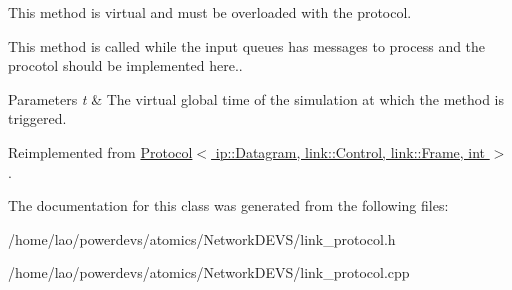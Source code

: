 This method is virtual and must be overloaded with the protocol. 

This method is called while the input queues has messages to process and the procotol should be implemented here..


\begin{DoxyParams}{Parameters}
{\em t} & The virtual global time of the simulation at which the method is triggered. \\
\hline
\end{DoxyParams}


Reimplemented from \hyperlink{classProtocol_a9c6247fa4ea8524d1214fca4cacbd781}{Protocol$<$ ip\+::\+Datagram, link\+::\+Control, link\+::\+Frame, int $>$}.



The documentation for this class was generated from the following files\+:\begin{DoxyCompactItemize}
\item 
/home/lao/powerdevs/atomics/\+Network\+D\+E\+V\+S/link\+\_\+protocol.\+h\item 
/home/lao/powerdevs/atomics/\+Network\+D\+E\+V\+S/link\+\_\+protocol.\+cpp\end{DoxyCompactItemize}
